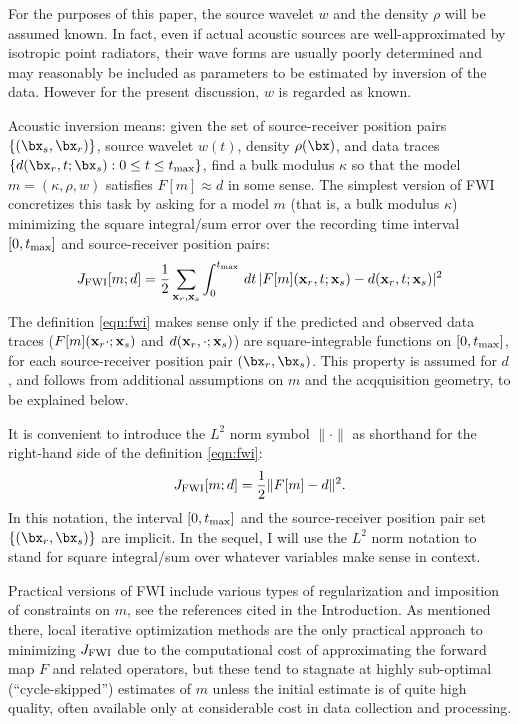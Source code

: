 For the purposes of this paper, the source wavelet $w$ and the density
$\rho$ will be assumed known. In fact, even if actual acoustic sources are
well-approximated by isotropic point radiators, their wave forms are
usually poorly determined and may reasonably be
included as  parameters to be estimated by inversion of the
data. However for the present discussion, $w$ is regarded as
known.

Acoustic inversion means: given the set of
source-receiver position pairs $\{(\bx_s,\bx_r)\}$, source wavelet
$w(t)$, density $\rho(\bx)$,  and data traces
$\{d(\bx_r,t;\bx_s): 0 \le t \le t_{\rm max}\}$, find a bulk modulus $\kappa$ so that the model
$m=(\kappa,\rho,w)$ satisfies $F[m] \approx d$ in some sense. The
simplest version of FWI concretizes this task by asking for a model
$m$ (that is, a bulk modulus $\kappa$) minimizing the square integral/sum
error over the recording time interval $[0,t_{\rm max}]$ and
source-receiver position pairs:
\begin{equation}
  \label{eqn:fwi}
  J_{\rm FWI}[m;d] =\frac{1}{2} \sum_{{\bf x}_r,{\bf x}_s}
  \int_0^{t_{\rm max}}\,dt\, |F[m]({\bf x}_r,t;{\bf x}_s) - d({\bf x}_r,t;{\bf x}_s)|^2
\end{equation}
The definition \ref{eqn:fwi} makes sense only if the predicted and
observed data traces ($F[m]({\bf x}_r\cdot;{\bf x}_s)$ and $d({\bf
  x}_r,\cdot;{\bf x}_s)$) are square-integrable functions on $[0,t_{\rm max}]$, for each
source-receiver position pair $(\bx_r,\bx_s)$. This property is
assumed for $d$, and follows from additional assumptions on $m$ and the
acqquisition geometry, to be explained below.

It is convenient to introduce the $L^2$ norm symbol $\| \cdot \|$ as
shorthand for the right-hand side of the definition \ref{eqn:fwi}:
\[
  J_{\rm FWI}[m;d]= \frac{1}{2}\|F[m]-d\|^2.
\]
In this notation, the interval $[0,t_{\rm max}]$ and the
source-receiver position pair set $\{(\bx_r,\bx_s)\}$ are implicit. In
the sequel, I will use the $L^2$ norm notation to stand for square
integral/sum over whatever variables make sense in context.

Practical versions of FWI include various types of regularization and
imposition of constraints on $m$, see the references cited in the
Introduction. As mentioned there, local iterative optimization methods
are the only practical approach to minimizing $J_{\rm FWI}$ due to the
computational cost of approximating the forward map $F$ and related
operators, but these tend to stagnate at highly sub-optimal
(``cycle-skipped'') estimates of $m$ unless the initial estimate is of
quite high quality, often available only at considerable cost in data
collection and processing.

